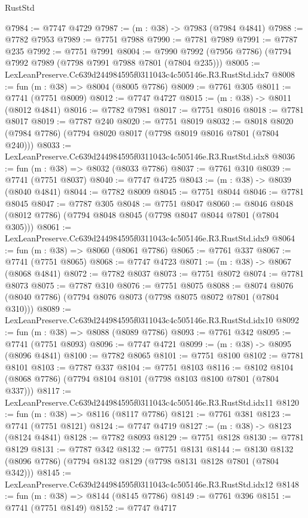 \begin{lexlean}{RustStd}
\begin{coremodule}
@7984 := @7747 @4729
@7987 := (m : @38) -> @7983 (@7984 @4841)
@7988 := @7782 @7953
@7989 := @7751 @7988
@7990 := @7781 @7989
@7991 := @7787 @235
@7992 := @7751 @7991
@8004 := @7990 @7992 (@7956 @7786) (@7794 @7992 @7989 (@7798 @7991 @7988 @7801 (@7804 @235)))
@8005 := LexLeanPreserve.Cc639d244984595f0311043c4c505146e.R3.RustStd.idx7
@8008 := fun (m : @38) => @8004 (@8005 @7786)
@8009 := @7761 @305
@8011 := @7741 (@7751 @8009)
@8012 := @7747 @4727
@8015 := (m : @38) -> @8011 (@8012 @4841)
@8016 := @7782 @7981
@8017 := @7751 @8016
@8018 := @7781 @8017
@8019 := @7787 @240
@8020 := @7751 @8019
@8032 := @8018 @8020 (@7984 @7786) (@7794 @8020 @8017 (@7798 @8019 @8016 @7801 (@7804 @240)))
@8033 := LexLeanPreserve.Cc639d244984595f0311043c4c505146e.R3.RustStd.idx8
@8036 := fun (m : @38) => @8032 (@8033 @7786)
@8037 := @7761 @310
@8039 := @7741 (@7751 @8037)
@8040 := @7747 @4725
@8043 := (m : @38) -> @8039 (@8040 @4841)
@8044 := @7782 @8009
@8045 := @7751 @8044
@8046 := @7781 @8045
@8047 := @7787 @305
@8048 := @7751 @8047
@8060 := @8046 @8048 (@8012 @7786) (@7794 @8048 @8045 (@7798 @8047 @8044 @7801 (@7804 @305)))
@8061 := LexLeanPreserve.Cc639d244984595f0311043c4c505146e.R3.RustStd.idx9
@8064 := fun (m : @38) => @8060 (@8061 @7786)
@8065 := @7761 @337
@8067 := @7741 (@7751 @8065)
@8068 := @7747 @4723
@8071 := (m : @38) -> @8067 (@8068 @4841)
@8072 := @7782 @8037
@8073 := @7751 @8072
@8074 := @7781 @8073
@8075 := @7787 @310
@8076 := @7751 @8075
@8088 := @8074 @8076 (@8040 @7786) (@7794 @8076 @8073 (@7798 @8075 @8072 @7801 (@7804 @310)))
@8089 := LexLeanPreserve.Cc639d244984595f0311043c4c505146e.R3.RustStd.idx10
@8092 := fun (m : @38) => @8088 (@8089 @7786)
@8093 := @7761 @342
@8095 := @7741 (@7751 @8093)
@8096 := @7747 @4721
@8099 := (m : @38) -> @8095 (@8096 @4841)
@8100 := @7782 @8065
@8101 := @7751 @8100
@8102 := @7781 @8101
@8103 := @7787 @337
@8104 := @7751 @8103
@8116 := @8102 @8104 (@8068 @7786) (@7794 @8104 @8101 (@7798 @8103 @8100 @7801 (@7804 @337)))
@8117 := LexLeanPreserve.Cc639d244984595f0311043c4c505146e.R3.RustStd.idx11
@8120 := fun (m : @38) => @8116 (@8117 @7786)
@8121 := @7761 @381
@8123 := @7741 (@7751 @8121)
@8124 := @7747 @4719
@8127 := (m : @38) -> @8123 (@8124 @4841)
@8128 := @7782 @8093
@8129 := @7751 @8128
@8130 := @7781 @8129
@8131 := @7787 @342
@8132 := @7751 @8131
@8144 := @8130 @8132 (@8096 @7786) (@7794 @8132 @8129 (@7798 @8131 @8128 @7801 (@7804 @342)))
@8145 := LexLeanPreserve.Cc639d244984595f0311043c4c505146e.R3.RustStd.idx12
@8148 := fun (m : @38) => @8144 (@8145 @7786)
@8149 := @7761 @396
@8151 := @7741 (@7751 @8149)
@8152 := @7747 @4717

\end{coremodule}
\end{lexlean}
